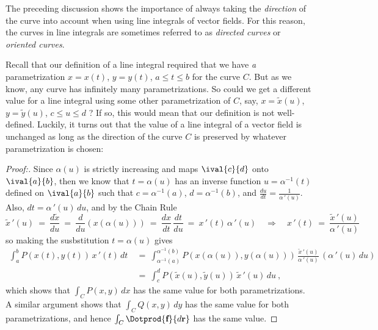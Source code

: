 The preceding discussion shows the importance of always taking the \emph{direction} of the curve into account when
using line integrals of vector fields. For this reason, the curves in line integrals are sometimes referred to as
\emph{directed curves} or \emph{oriented curves}.

Recall that our definition of a line integral required that we have
\emph{a} parametrization $x=x(t)$, $y=y(t)$, $a \le t \le b$ for the curve $C$. But as we know, any curve has
infinitely many parametrizations. So could we get a different value for a
line integral using some other parametrization of $C$, say, $x=\tilde{x}(u)$, $y=\tilde{y}(u)$, $c \le u \le d$ ? If so,
this would mean that our definition is not well-defined. Luckily, it turns out that the value of a line
integral of a vector field is unchanged as long as the direction of the curve $C$ is preserved by whatever
parametrization is chosen:

\begin{proof}[Proof:]
 Since $\alpha(u)$ is strictly increasing and maps $\ival{c}{d}$ onto $\ival{a}{b}$, then we know that $t=\alpha(u)$ has
 an inverse function $u=\alpha^{-1}(t)$ defined on $\ival{a}{b}$ such that $c=\alpha^{-1}(a)$,
 $d=\alpha^{-1}(b)$, and $\frac{du}{dt} = \frac{1}{\alpha\,'(u)}$. Also, $dt = \alpha\,'(u)\,du$, and by the Chain Rule
 \begin{displaymath}
  \tilde{x}\,'(u) ~=~ \frac{d\tilde{x}}{du} ~=~ \frac{d}{du}(x(\alpha(u))) ~=~ \frac{dx}{dt}\,\frac{dt}{du} ~=~
  x\,'(t)\,\alpha\,'(u) \quad\Rightarrow\quad x\,'(t) ~=~ \frac{\tilde{x}\,'(u)}{\alpha\,'(u)}
 \end{displaymath}
 so making the susbstitution $t=\alpha(u)$ gives
 \begin{align*}
  \int_a^b P(x(t),y(t))\,x\,'(t)\,dt ~&=~
   \int_{\alpha^{-1}(a)}^{\alpha^{-1}(b)} P(x(\alpha(u)),y(\alpha(u)))\,\frac{\tilde{x}\,'(u)}{\alpha\,'(u)}
   \,(\alpha\,'(u)\,du)\\
   &=~ \int_c^d P(\tilde{x}(u),\tilde{y}(u))\,\tilde{x}\,'(u)\,du ~,
 \end{align*}
 which shows that $\int_C P(x,y)\,dx$ has the same value for both parametrizations. A similar argument shows that
 $\int_C Q(x,y)\,dy$ has the same value for both parametrizations, and hence $\int_C \Dotprod{\textbf{f}}{d\textbf{r}}$
 has the same value.
 \vspace{-3mm}
\end{proof}

